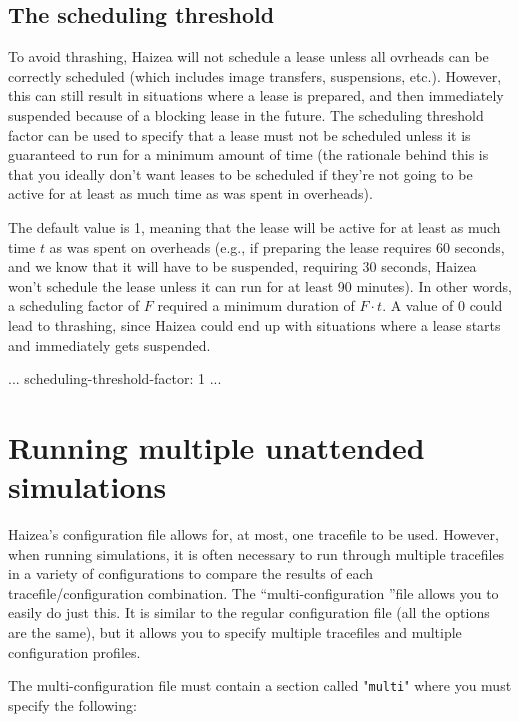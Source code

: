 \subsection{The scheduling threshold}

To avoid thrashing, Haizea will not schedule a lease unless all ovrheads
can be correctly scheduled (which includes image transfers, suspensions, etc.).
However, this can still result in situations where a lease is prepared,
and then immediately suspended because of a blocking lease in the future.
The scheduling threshold factor can be used to specify that a lease must
not be scheduled unless it is guaranteed to run for a minimum amount of
time (the rationale behind this is that you ideally don't want leases
to be scheduled if they're not going to be active for at least as much time
as was spent in overheads).
            
The default value is 1, meaning that the lease will be active for at least
as much time $t$ as was spent on overheads (e.g., if preparing the lease requires
60 seconds, and we know that it will have to be suspended, requiring 30 seconds,
Haizea won't schedule the lease unless it can run for at least 90 minutes).
In other words, a scheduling factor of $F$ required a minimum duration of 
$F\cdot t$. A value of 0 could lead to thrashing, since Haizea could end up with
situations where a lease starts and immediately gets suspended.   

\begin{wideshellverbatim}
[scheduling]
...
scheduling-threshold-factor: 1
...
\end{wideshellverbatim}

\section{Running multiple unattended simulations}
\label{sec:multiplesim}
Haizea's configuration file allows for, at most, one tracefile to be used. However, when running simulations, it is often necessary to run through multiple tracefiles in a variety of configurations to compare the results of each tracefile/configuration combination. The ``multi-configuration ''file allows you to easily do just this. It is similar to the regular configuration file (all the options are the same), but it allows you to specify multiple tracefiles and multiple configuration profiles.

The multi-configuration file must contain a section called "\texttt{multi}" where you must specify the following:

